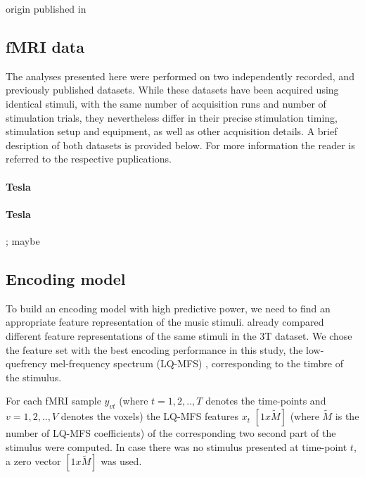 origin \citet{CTK+2012}
published in \citet{HDH+2015}

\subsection*{fMRI data}

The analyses presented here were performed on two independently recorded,
and previously published datasets. While these datasets have been acquired
using identical stimuli, with the same number of acquisition runs and
number of stimulation trials, they nevertheless differ in their precise
stimulation timing, stimulation setup and equipment, as well as other
acquisition details. A brief desription of both datasets is provided below.
For more information the reader is referred to the respective puplications.

\paragraph{\unit[3]{Tesla}}
%

\paragraph{\unit[7]{Tesla}}
%
\citet{HDH+2015}; maybe \citet{HBI+14}

\subsection*{Encoding model}


To build an encoding model with high predictive power, we need to find an
appropriate feature representation of the music stimuli.  \citet{CTK+2012}
already compared different feature representations of the same stimuli in the
3T dataset. We chose the feature set with the best encoding performance in this
study, the low-quefrency mel-frequency spectrum (LQ-MFS) \citep{HDH+2015},
corresponding to the timbre of the stimulus. 




For each f{MRI} sample $y_{vt}$ (where $t=1,2,..,T$ denotes the time-points and
$v=1,2,..,V$ denotes the voxels) the LQ-MFS features $x_{t}$ $[1x\widetilde{M}]$
(where $\widetilde{M}$ is the number of LQ-MFS coefficients) of the
corresponding two second part of the stimulus were computed. In case there was
no stimulus presented at time-point $t$, a zero vector $[1x\widetilde{M}]$ was
used. 

